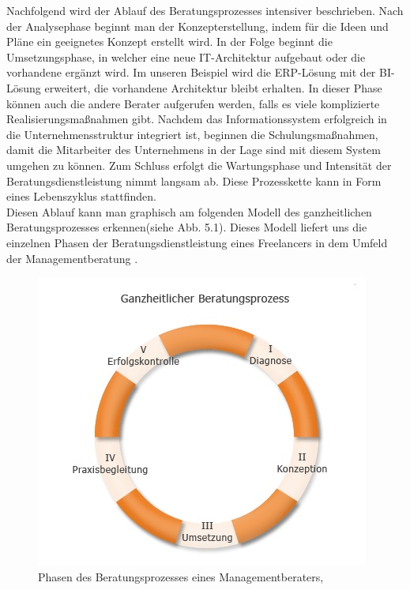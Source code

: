 	Nachfolgend wird der Ablauf des Beratungsprozesses intensiver beschrieben. Nach der Analysephase beginnt man der Konzepterstellung, indem für die Ideen und Pläne ein geeignetes Konzept erstellt wird. In der Folge beginnt die Umsetzungsphase, in welcher eine neue IT-Architektur aufgebaut oder die vorhandene ergänzt wird. Im unseren Beispiel wird die ERP-Lösung mit der BI-Lösung erweitert, die vorhandene Architektur bleibt erhalten. In dieser Phase können auch die andere Berater aufgerufen werden, falls es viele komplizierte Realisierungsmaßnahmen gibt.
	Nachdem das Informationssystem erfolgreich in die Unternehmensstruktur integriert ist, beginnen die Schulungsmaßnahmen, damit die Mitarbeiter des Unternehmens in der Lage sind mit diesem System umgehen zu können. Zum Schluss erfolgt die Wartungsphase und Intensität der Beratungsdienstleistung nimmt langsam ab. Diese Prozesskette kann in Form eines Lebenszyklus stattfinden.\\
	Diesen Ablauf kann man graphisch am folgenden Modell des ganzheitlichen Beratungsprozesses erkennen(siehe Abb. 5.1). Dieses Modell liefert uns die einzelnen Phasen der Beratungsdienstleistung eines Freelancers in dem Umfeld der Managementberatung \cite{MngmBerPhasen}.


\begin{figure}[htp]
\centering
\includegraphics[width=0.7\linewidth]{./images/beratungsproz}
\caption{Phasen des Beratungsprozesses eines Managementberaters, \cite{PhasenBeratungsprozess} }
\label{fig:beratungsproz}
\end{figure}
	
